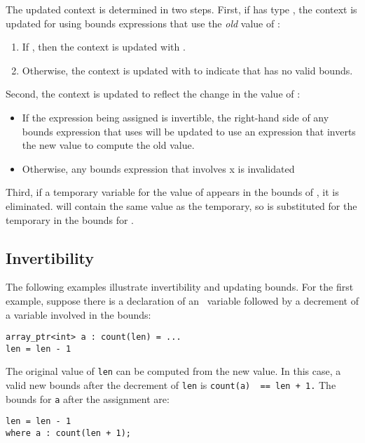 The updated context is determined in two steps. First, if
 has type \arrayptr, the context is updated for
 using bounds expressions that use the \emph{old} value of :

\begin{enumerate}
\item
  If , then the context is updated with
  .
\item
  Otherwise, the context is updated with 
   to indicate that  has no valid bounds.
\end{enumerate}

Second, the context is updated to reflect the change in the value of
:

\begin{itemize}
\item
  If the expression being assigned is invertible, the right-hand side of
  any bounds expression that uses  will be updated to use an
  expression that inverts the new value to compute the old value.
\item
  Otherwise, any bounds expression that involves x is invalidated
\end{itemize}

Third, if a temporary variable for the value of  appears
in the bounds of , it is eliminated.  
will contain the same value as the temporary, so  is 
substituted for the temporary in the bounds for .

\subsection{Invertibility}

The following examples illustrate invertibility and updating bounds. For
the first example, suppose there is a declaration of an
\arrayptr\ variable followed by a decrement of a variable
involved in the bounds:

\begin{lstlisting}
array_ptr<int> a : count(len) = ...
len = len - 1
\end{lstlisting}

The original value of \lstinline|len| can be computed from the new value.
In this case, a valid new bounds after the decrement of \lstinline|len| is
\lstinline|count(a)  == len + 1.| The bounds for \lstinline|a| after the
assignment are:
\begin{lstlisting}
len = len - 1
where a : count(len + 1);
\end{lstlisting}

